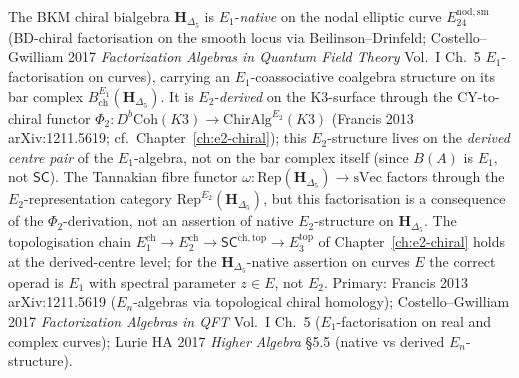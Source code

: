 \begin{remark}
\label{rem:cydkappa-e1-e2-discipline}
The BKM chiral bialgebra $\mathbf H_{\Delta_5}$ is
$E_1$-\emph{native} on the nodal elliptic
curve $E^{\mathrm{nod,sm}}_{24}$ (BD-chiral
factorisation on the smooth locus via Beilinson--Drinfeld; Costello--Gwilliam 2017
\emph{Factorization Algebras in Quantum Field Theory} Vol.~I Ch.~5
$E_1$-factorisation on curves), carrying an $E_1$-coassociative
coalgebra structure on its bar complex
$B^{E_1}_{\mathrm{ch}}(\mathbf H_{\Delta_5})$. It is
$E_2$-\emph{derived} on the K3-surface through the CY-to-chiral
functor $\Phi_2\colon D^b\mathrm{Coh}(K3) \to \mathrm{ChirAlg}^{E_2}(K3)$
(Francis 2013 arXiv:1211.5619; cf.\
Chapter~\ref{ch:e2-chiral}); this $E_2$-structure lives on the
\emph{derived centre pair} of the $E_1$-algebra, not on the bar
complex itself (since $B(A)$ is $E_1$, not $\mathsf{SC}$). The Tannakian
fibre functor
$\omega\colon \mathrm{Rep}(\mathbf H_{\Delta_5}) \to \mathrm{sVec}$
factors through the $E_2$-representation category
$\mathrm{Rep}^{E_2}(\mathbf H_{\Delta_5})$, but this factorisation is
a consequence of the $\Phi_2$-derivation, not an assertion of native
$E_2$-structure on $\mathbf H_{\Delta_5}$. The topologisation chain
$E_1^{\mathrm{ch}} \to E_2^{\mathrm{ch}} \to
\mathsf{SC}^{\mathrm{ch,top}} \to E_3^{\mathrm{top}}$
of Chapter~\ref{ch:e2-chiral} holds at the
derived-centre level; for the $\mathbf H_{\Delta_5}$-native assertion
on curves $E$ the correct operad is $E_1$ with spectral parameter
$z\in E$, not $E_2$. Primary: Francis 2013 arXiv:1211.5619
($E_n$-algebras via topological chiral homology);
Costello--Gwilliam 2017 \emph{Factorization Algebras in QFT} Vol.~I
Ch.~5 ($E_1$-factorisation on real and complex curves); Lurie HA 2017
\emph{Higher Algebra} \S5.5 (native vs derived $E_n$-structure).
\end{remark}


